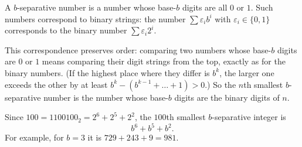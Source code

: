 A $b$-separative number is a number whose base-$b$ digits are all $0$ or $1$. Such numbers correspond to binary strings: the number $\sum\varepsilon_ib^i$ with $\varepsilon_i\in\{0,1\}$ corresponds to the binary number $\sum\varepsilon_i2^i$.

This correspondence preserves order: comparing two numbers whose base-$b$ digits are $0$ or $1$ means comparing their digit strings from the top, exactly as for the binary numbers. (If the highest place where they differ is $b^k$, the larger one exceeds the other by at least $b^k-(b^{k-1}+\dots+1)>0$.) So the $n$th smallest $b$-separative number is the number whose base-$b$ digits are the binary digits of $n$.

Since $100=1100100_2=2^6+2^5+2^2$, the $100$th smallest $b$-separative integer is
\[
\boxed{b^6+b^5+b^2}.
\]
For example, for $b=3$ it is $729+243+9=981$.
